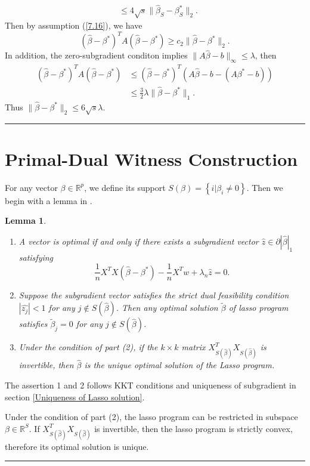 \documentclass[12pt]{article}
\numberwithin{equation}{section}
\newtheorem{lemma}[theorem]{Lemma}
\newenvironment{proof}{{\bf Proof:}}{\hfill\rule{2mm}{2mm}}
\begin{document}
\begin{proof}
\begin{align*}
	&\leq 4\sqrt{s}\|\hat{\beta}_{S}-\beta^{*}_{S}\|_2.
	\end{align*}
	Then by assumption (\ref{7.16}), we have
	$$
	\left(\hat{\beta}-\beta^{*}\right)^TA\left(\hat{\beta}-\beta^{*}\right)\geq c_2\|\hat{\beta}-\beta^{*}\|_2.
	$$
	In addition, the zero-subgradient conditon implies $\|A\hat{\beta}-b\|_{\infty}\leq \lambda$, then
	\begin{align*}
	\left(\hat{\beta}-\beta^{*}\right)^TA\left(\hat{\beta}-\beta^{*}\right)&\leq \left(\hat{\beta}-\beta^{*}\right)^T\left(A\hat{\beta}-b-(A\beta^{*}-b)\right)\\
	&\leq \frac{3}{2}\lambda\|\hat{\beta}-\beta^{*}\|_1.
	\end{align*}
	Thus $\|\hat{\beta}-\beta^{*}\|_2\leq 6\sqrt{s}\lambda$.
\end{proof}
\section{Primal-Dual Witness Construction}
For any vector $\beta \in \mathbb{R}^p$, we define its support $S(\beta)=\left\{i | \beta_{i} \neq 0\right\}$. Then we begin with a lemma in  \citet*{wainwright2009sharp}.
\begin{lemma}\label{lemma 7.2}
	\begin{enumerate}
		\item A vector is optimal if and only if there exists a subgradient vector $\hat z\in \partial |\hat{\beta}|_1$ satisfying
		\begin{equation}\label{7.4}
		\frac{1}{n} X^{T} X\left(\widehat{\beta}-\beta^{*}\right)-\frac{1}{n} X^{T} w+\lambda_{n} \widehat{z}=0.
		\end{equation}
		\item Suppose the subgradient vector satisfies the strict dual feasibility condition $|\widehat{z_j}|<1$ for any $j \notin S(\hat{\beta})$. Then any optimal solution $\tilde{\beta}$ of lasso program satisfies $\tilde{\beta}_j=0$ for any $j \notin S(\hat{\beta})$.
		
		\item Under the condition of part (2), if the $k\times k$ matrix $X_{S(\hat{\beta})}^{T} X_{S(\hat{\beta})}$ is invertible, then $\hat{\beta}$ is the unique optimal solution of the Lasso program.
	\end{enumerate}
\end{lemma}
\begin{proof}
	The assertion 1 and 2 follows KKT conditions and uniqueness of subgradient in section \ref{Uniqueness of Lasso solution}. 
	
	Under the condition of part (2), the lasso program can be restricted in subspace $\beta \in \mathbb{R}^S$. If $X_{S(\hat{\beta})}^{T} X_{S(\hat{\beta})}$ is invertible, then the lasso program is strictly convex, therefore its optimal solution is unique.
\end{proof}
\end{document}
